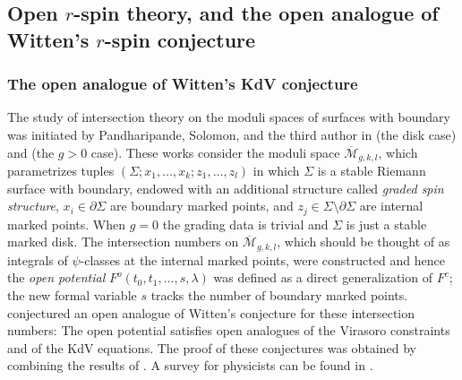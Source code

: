 \documentclass[11pt]{amsart}
\theoremstyle{definition}
\theoremstyle{remark}
\newcommand{\<}{\left<}
\renewcommand{\>}{\right>}
\numberwithin{equation}{section}
\def\Mbar{{\overline{\mathcal M}}}
\begin{document}
\subsection{Open $r$-spin theory, and the open analogue of Witten's $r$-spin conjecture}
\subsubsection{The open analogue of Witten's KdV conjecture}
The study of intersection theory on the moduli spaces of surfaces with boundary was initiated by Pandharipande, Solomon, and the third author in \cite{PST14} (the disk case) and \cite{ST1,Tes15} (the $g>0$ case).  These works consider the moduli space $\Mbar_{g,k,l}$, which parametrizes tuples $(\Sigma; x_1, \ldots, x_k; z_1, \ldots, z_l)$ in which $\Sigma$ is a stable Riemann surface with boundary, endowed with an additional structure called \emph{graded spin structure}, $x_i \in \partial\Sigma$ are boundary marked points, and $z_j \in \Sigma \setminus \partial\Sigma$ are internal marked points. When $g=0$ the grading data is trivial and $\Sigma$ is just a stable marked disk. The intersection numbers on $\Mbar_{g,k,l}$, which should be thought of as integrals of $\psi$-classes at the internal marked points, were constructed and hence the \emph{open potential} $F^o(t_0,t_1,\ldots,s,\lambda)$ was defined as a direct generalization of $F^c$; the new formal variable $s$ tracks the number of boundary marked points. \cite{PST14} conjectured an open analogue of Witten's conjecture for these intersection %
numbers: The open %
potential satisfies open analogues of the Virasoro constraints and of the KdV equations. The proof of these conjectures was obtained by combining the results of \cite{Bur16,Tes15,BT17}. A survey for physicists can be found in \cite{DijkWit}.
\end{document}
